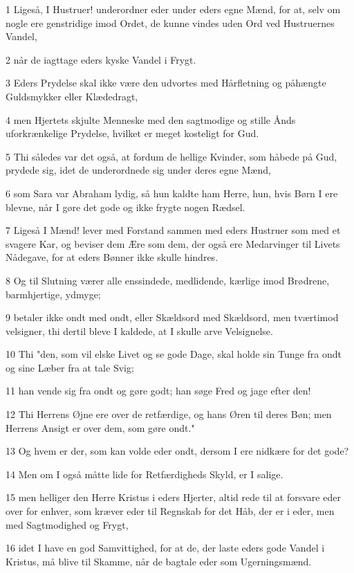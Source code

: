 \par 1 Ligeså, I Hustruer! underordner eder under eders egne Mænd, for at, selv om nogle ere genstridige imod Ordet, de kunne vindes uden Ord ved Hustruernes Vandel,
\par 2 når de iagttage eders kyske Vandel i Frygt.
\par 3 Eders Prydelse skal ikke være den udvortes med Hårfletning og påhængte Guldsmykker eller Klædedragt,
\par 4 men Hjertets skjulte Menneske med den sagtmodige og stille Ånds uforkrænkelige Prydelse, hvilket er meget kosteligt for Gud.
\par 5 Thi således var det også, at fordum de hellige Kvinder, som håbede på Gud, prydede sig, idet de underordnede sig under deres egne Mænd,
\par 6 som Sara var Abraham lydig, så hun kaldte ham Herre, hun, hvis Børn I ere blevne, når I gøre det gode og ikke frygte nogen Rædsel.
\par 7 Ligeså I Mænd! lever med Forstand sammen med eders Hustruer som med et svagere Kar, og beviser dem Ære som dem, der også ere Medarvinger til Livets Nådegave, for at eders Bønner ikke skulle hindres.
\par 8 Og til Slutning værer alle enssindede, medlidende, kærlige imod Brødrene, barmhjertige, ydmyge;
\par 9 betaler ikke ondt med ondt, eller Skældsord med Skældsord, men tværtimod velsigner, thi dertil bleve I kaldede, at I skulle arve Velsignelse.
\par 10 Thi "den, som vil elske Livet og se gode Dage, skal holde sin Tunge fra ondt og sine Læber fra at tale Svig;
\par 11 han vende sig fra ondt og gøre godt; han søge Fred og jage efter den!
\par 12 Thi Herrens Øjne ere over de retfærdige, og hans Øren til deres Bøn; men Herrens Ansigt er over dem, som gøre ondt."
\par 13 Og hvem er der, som kan volde eder ondt, dersom I ere nidkære for det gode?
\par 14 Men om I også måtte lide for Retfærdigheds Skyld, er I salige.
\par 15 men helliger den Herre Kristus i eders Hjerter, altid rede til at forsvare eder over for enhver, som kræver eder til Regnskab for det Håb, der er i eder, men med Sagtmodighed og Frygt,
\par 16 idet I have en god Samvittighed, for at de, der laste eders gode Vandel i Kristus, må blive til Skamme, når de bagtale eder som Ugerningsmænd.
